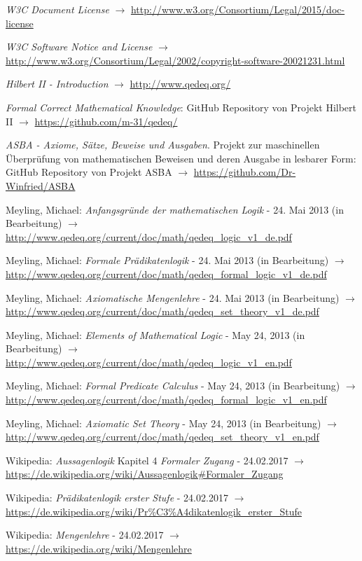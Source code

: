 \documentclass[english,ngerman,parskip=half,headsepline,footsepline]{scrreprt}
\begin{document}
\begin{flushleft}
\begin{thebibliography}{12}
			\emph{W3C Document License} $\rightarrow$ \url{http://www.w3.org/Consortium/Legal/2015/doc-license}
			
			\emph{W3C Software Notice and License} $\rightarrow$ \url{http://www.w3.org/Consortium/Legal/2002/copyright-software-20021231.html}
			
			\emph{Hilbert II - Introduction} $\rightarrow$ \url{http://www.qedeq.org/}
			
			\emph{Formal Correct Mathematical Knowledge}: GitHub Repository von Projekt Hilbert II $\rightarrow$ \url{https://github.com/m-31/qedeq/}
			
			\emph{ASBA - Axiome, Sätze, Beweise und Ausgaben}. Projekt zur maschinellen Überprüfung von mathematischen Beweisen und deren Ausgabe in lesbarer Form: GitHub Repository von Projekt ASBA $\rightarrow$ \url{https://github.com/Dr-Winfried/ASBA}
			
			Meyling, Michael: \emph{Anfangsgründe der mathematischen Logik} - 24. Mai 2013 (in Bearbeitung) $\rightarrow$ \url{http://www.qedeq.org/current/doc/math/qedeq_logic_v1_de.pdf}
			
			Meyling, Michael: \emph{Formale Prädikatenlogik} - 24. Mai 2013 (in Bearbeitung) $\rightarrow$ \url{http://www.qedeq.org/current/doc/math/qedeq_formal_logic_v1_de.pdf}
			
			Meyling, Michael: \emph{Axiomatische Mengenlehre} - 24. Mai 2013 (in Bearbeitung) $\rightarrow$ \url{http://www.qedeq.org/current/doc/math/qedeq_set_theory_v1_de.pdf}
			
			Meyling, Michael: \emph{Elements of Mathematical Logic} - May 24, 2013 (in Bearbeitung) $\rightarrow$ \url{http://www.qedeq.org/current/doc/math/qedeq_logic_v1_en.pdf}
			
			Meyling, Michael: \emph{Formal Predicate Calculus} - May 24, 2013 (in Bearbeitung) $\rightarrow$ \url{http://www.qedeq.org/current/doc/math/qedeq_formal_logic_v1_en.pdf}
			
			Meyling, Michael: \emph{Axiomatic Set Theory} - May 24, 2013 (in Bearbeitung) $\rightarrow$ \url{http://www.qedeq.org/current/doc/math/qedeq_set_theory_v1_en.pdf}
			
			Wikipedia: \emph{Aussagenlogik} Kapitel 4 \emph{Formaler Zugang} - 24.02.2017 $\rightarrow$ \url{https://de.wikipedia.org/wiki/Aussagenlogik#Formaler_Zugang}
			
			Wikipedia: \emph{Prädikatenlogik erster Stufe} - 24.02.2017  $\rightarrow$ \url{https://de.wikipedia.org/wiki/Pr%C3%A4dikatenlogik_erster_Stufe}
			
			Wikipedia: \emph{Mengenlehre} - 24.02.2017  $\rightarrow$ \url{https://de.wikipedia.org/wiki/Mengenlehre}
				
		\end{thebibliography}
	\end{flushleft}
	\thispagestyle{scrheadings}
	
\end{document}
